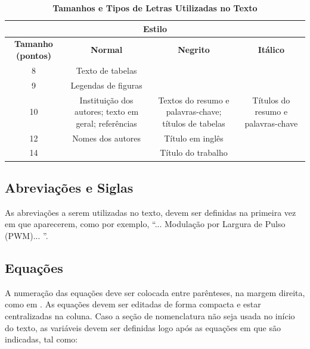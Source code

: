 \begin{table}[!ht]
	\centering
	\caption{\textbf{Tamanhos e Tipos de Letras Utilizadas no Texto}}
	\footnotesize
	\setlength{\tabcolsep}{5pt}
	\begin{tabular}{cccc}
		\toprule [1.3pt]	
		\multicolumn{4}{c}{ \textbf{Estilo} } \\
		\hline
		\multirow{2}{1.1cm}{\centering \textbf{Tamanho (pontos)}} & \multirow{2}{*}{\textbf{Normal}} &
		\multirow{2}{*}{\textbf{Negrito}} & \multirow{2}{*}{\textbf{Itálico}} \\
		&  &  & \\		
		\hline
		8 & Texto de tabelas &  &  \\
		\hline
		\multirow{2}{*}{9} & \multirow{2}{2cm}{\centering Legendas de figuras}  &  &  \\
		& & & \\
		\hline
		\multirow{3}{*}{10} &  
		\multirow{3}{2cm}{\centering Instituição dos autores; texto em geral; referências}  & 
		\multirow{3}{2cm}{\centering Textos do resumo e palavras-chave; títulos de tabelas} & 
		\multirow{3}{2.1cm}{\centering Títulos do resumo e palavras-chave} \\
		& &  &  \\
		& &  &  \\
		\hline
		\multirow{2}{*}{12} & \multirow{2}{2cm}{\centering Nomes dos autores}  & \multirow{2}{*}{Título em inglês} &  \\
		& & & \\
		\hline
		14 &  & Título do trabalho & \vspace*{-0.8mm}\\
		\bottomrule[1.3pt]
	\end{tabular} \label{table:TabelaI}
\end{table}


\subsection{Abreviações e Siglas}

As abreviações a serem utilizadas no texto, devem ser definidas na primeira vez em que aparecerem, como por exemplo, ``... Modulação por Largura de Pulso  (PWM)... ''.

\subsection{Equações}

A numeração das equações deve ser colocada entre parênteses, na margem direita, como em . As equações devem ser editadas de forma compacta e estar centralizadas na coluna. Caso a seção de nomenclatura não seja usada no início do texto, as variáveis devem ser definidas logo após as equações em que são indicadas, tal como:

